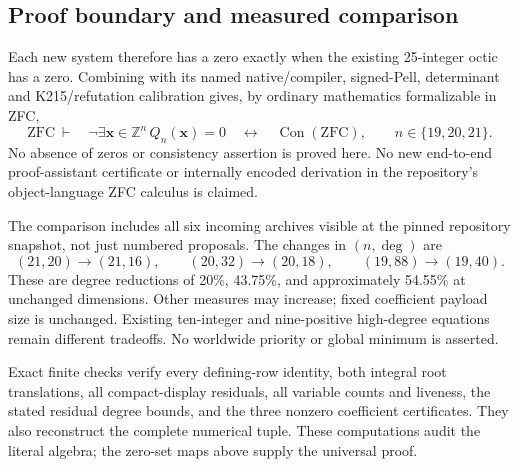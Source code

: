\subsection{Proof boundary and measured comparison}

Each new system therefore has a zero exactly when the existing
25-integer octic has a zero. Combining with its named native/compiler,
signed-Pell, determinant and K215/refutation calibration gives, by ordinary
mathematics formalizable in ZFC,
\[
 \mathrm{ZFC}\ \vdash\quad
 \neg\exists\boldsymbol{x}\in\mathbb Z^n\,
       Q_n(\boldsymbol{x})=0
 \quad\longleftrightarrow\quad\operatorname{Con}(\mathrm{ZFC}),
 \qquad n\in\{19,20,21\}.
\]
No absence of zeros or consistency assertion is proved here. No new
end-to-end proof-assistant certificate or internally encoded derivation
in the repository's object-language ZFC calculus is claimed.

The comparison includes all six incoming archives visible at the pinned
repository snapshot, not just numbered proposals. The changes in
$(n,\deg)$ are
\[
 (21,20)\longrightarrow(21,16),\qquad
 (20,32)\longrightarrow(20,18),\qquad
 (19,88)\longrightarrow(19,40).
\]
These are degree reductions of 20\%,
43.75\%, and approximately 54.55\% at unchanged dimensions. Other
measures may increase; fixed coefficient payload size is unchanged.
Existing ten-integer and nine-positive high-degree equations remain
different tradeoffs. No worldwide priority or global minimum is asserted.

Exact finite checks verify every defining-row identity, both integral
root translations, all compact-display residuals, all variable counts and
liveness, the stated residual degree bounds, and the three nonzero
coefficient certificates. They also reconstruct the complete numerical
tuple. These computations audit the literal algebra; the zero-set maps
above supply the universal proof.
